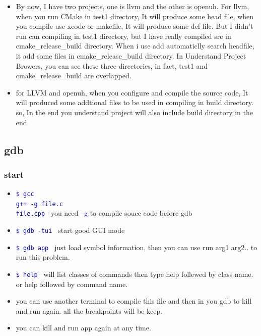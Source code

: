 \documentclass[a4paper,12pt,twoside]{book}
\newcommand{\linuxcommand}[1]{\texttt{\textcolor{blue}{\$ #1 \Pisymbol{psy}{191}}}}
\newcommand{\op}[1]{\textcolor{blue}{-#1}}
\begin{document}
\begin{itemize}
\item By now, I have two projects, one is llvm and the other is openuh.  For llvm, when you run CMake in test1 directory, It will produce some head file, when you compile use xcode or makefile, It will produce some def file. But I didn't run can compiling in test1 directory, but I have really compiled src in cmake\_release\_build directory. When i use add automaticlly search headfile, it add some files in cmake\_release\_build directory. In Understand Project Browers, you can see these three directories, in fact, test1 and cmake\_release\_build are overlapped. 

\item for LLVM and openuh, when you configure and compile the source code, It will produced some addtional files to be used in compiling in build directory. so, In the end you understand project will also include build directory in the end. 
  
\end{itemize}

\subsection{gdb}
\subsubsection{start}
\begin{itemize}
\item \linuxcommand{gcc\\g++ -g file.c\\file.cpp} you need \op{-g} to compile souce code before gdb
  \item \linuxcommand{gdb -tui} start good GUI mode
  \item \linuxcommand{gdb app} just load symbol information, then you can use run arg1 arg2.. to run this problem.
  \item \linuxcommand{help} will list classes of commands then type help follewed by class name.  or help followed by command name. 
  \item you can use another terminal to compile this file and then in you gdb to kill and run again. all the breakpoints will be keep.
  \item you can kill and run app again at any time. 
 
\end{itemize}
\end{document}
